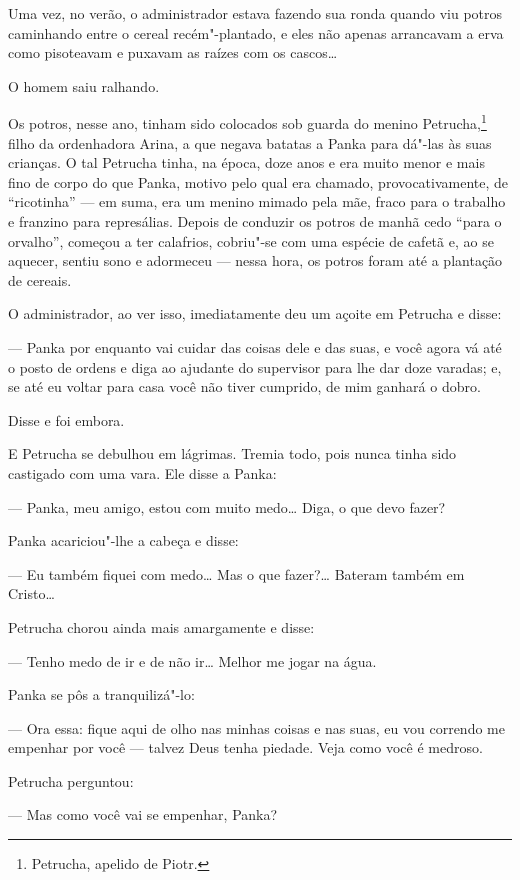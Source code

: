 Uma vez, no verão, o administrador estava fazendo sua ronda quando viu
potros caminhando entre o cereal recém"-plantado, e eles não apenas
arrancavam a erva como pisoteavam e puxavam as raízes com os cascos\ldots{}

O homem saiu ralhando.

Os potros, nesse ano, tinham sido colocados sob guarda do menino
Petrucha,\footnote{Petrucha, apelido de Piotr.} filho da ordenhadora
Arina, a que negava batatas a Panka para dá"-las às suas crianças. O tal
Petrucha tinha, na época, doze anos e era muito menor e mais fino de
corpo do que Panka, motivo pelo qual era chamado, provocativamente, de
``ricotinha'' --- em suma, era um menino mimado pela mãe, fraco para o
trabalho e franzino para represálias. Depois de conduzir os potros de
manhã cedo ``para o orvalho'', começou a ter calafrios, cobriu"-se com
uma espécie de cafetã e, ao se aquecer, sentiu sono e adormeceu --- nessa hora, os potros foram até a plantação de cereais.

O administrador, ao ver isso, imediatamente deu um açoite em Petrucha e
disse:

--- Panka por enquanto vai cuidar das coisas dele e das suas, e você
agora vá até o posto de ordens e diga ao ajudante do supervisor para lhe
dar doze varadas; e, se até eu voltar para casa você não tiver cumprido,
de mim ganhará o dobro.

Disse e foi embora.

E Petrucha se debulhou em lágrimas. Tremia todo, pois nunca tinha sido
castigado com uma vara. Ele disse a Panka:

--- Panka, meu amigo, estou com muito medo\ldots{} Diga, o que devo fazer?

Panka acariciou"-lhe a cabeça e disse:

--- Eu também fiquei com medo\ldots{} Mas o que fazer?\ldots{} Bateram também em
Cristo\ldots{}

Petrucha chorou ainda mais amargamente e disse:

--- Tenho medo de ir e de não ir\ldots{} Melhor me jogar na água.

Panka se pôs a tranquilizá"-lo:

--- Ora essa: fique aqui de olho nas minhas coisas e nas suas, eu vou
correndo me empenhar por você --- talvez Deus tenha piedade. Veja como
você é medroso.

Petrucha perguntou:

--- Mas como você vai se empenhar, Panka?


